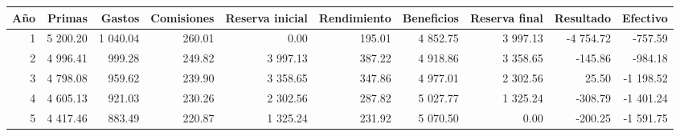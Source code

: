 \begin{tabular}{rrrrrrrrrr}
\toprule
Año & Primas & Gastos & Comisiones & Reserva inicial & Rendimiento & Beneficios & Reserva final & Resultado & Efectivo \\
\midrule
1 & 5 200.20 & 1 040.04 & 260.01 & 0.00 & 195.01 & 4 852.75 & 3 997.13 & -4 754.72 & -757.59 \\
2 & 4 996.41 & 999.28 & 249.82 & 3 997.13 & 387.22 & 4 918.86 & 3 358.65 & -145.86 & -984.18 \\
3 & 4 798.08 & 959.62 & 239.90 & 3 358.65 & 347.86 & 4 977.01 & 2 302.56 & 25.50 & -1 198.52 \\
4 & 4 605.13 & 921.03 & 230.26 & 2 302.56 & 287.82 & 5 027.77 & 1 325.24 & -308.79 & -1 401.24 \\
5 & 4 417.46 & 883.49 & 220.87 & 1 325.24 & 231.92 & 5 070.50 & 0.00 & -200.25 & -1 591.75 \\
\bottomrule
\end{tabular}
